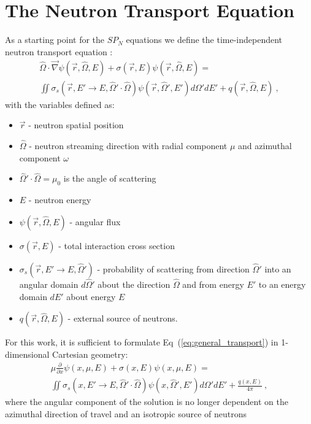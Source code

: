 \section{The Neutron Transport Equation}
\label{sec:transport_eq}
As a starting point for the $SP_N$ equations we define the
time-independent neutron transport equation
\citep{lewis_computational_1993}:
\begin{multline}
  \hat{\Omega} \cdot \vec{\nabla} \psi(\vec{r},\hat{\Omega},E) +
  \sigma(\vec{r},E) \psi(\vec{r},\hat{\Omega},E) = \\ \iint
  \sigma_s(\vec{r},E' \rightarrow E,\hat{\Omega}' \cdot \hat{\Omega})
  \psi(\vec{r},\hat{\Omega}',E') d\Omega' dE' +
  q(\vec{r},\hat{\Omega},E)\:,
  \label{eq:general_transport}
\end{multline}
with the variables defined as:
\begin{itemize}
\item $\vec{r}$ - neutron spatial position
\item $\hat{\Omega}$ - neutron streaming direction with radial
  component $\mu$ and azimuthal component $\omega$
\item $\hat{\Omega}' \cdot \hat{\Omega} = \mu_0$ is the angle of
  scattering
\item $E$ - neutron energy
\item $\psi(\vec{r},\hat{\Omega},E)$ - angular flux
\item $\sigma(\vec{r},E)$ - total interaction cross section
\item $\sigma_s(\vec{r},E' \rightarrow E,\hat{\Omega}')$ - probability
  of scattering from direction $\hat{\Omega}'$ into an angular domain
  $d\hat{\Omega}'$ about the direction $\hat{\Omega}$ and from energy
  $E'$ to an energy domain $dE'$ about energy $E$
\item $q(\vec{r},\hat{\Omega},E)$ - external source of neutrons.
\end{itemize}
For this work, it is sufficient to formulate
Eq~(\ref{eq:general_transport}) in 1-dimensional Cartesian geometry:
\begin{multline}
  \mu \frac{\partial}{\partial x} \psi(x,\mu,E) + \sigma(x,E)
  \psi(x,\mu,E) = \\ \iint \sigma_s(x,E' \rightarrow E,\hat{\Omega}'
  \cdot \hat{\Omega}) \psi(x,\hat{\Omega}',E') d\Omega' dE' +
  \frac{q(x,E)}{4 \pi}\:,
  \label{eq:cart_1d_transport}
\end{multline}
where the angular component of the solution is no longer dependent on
the azimuthal direction of travel and an isotropic source of neutrons
